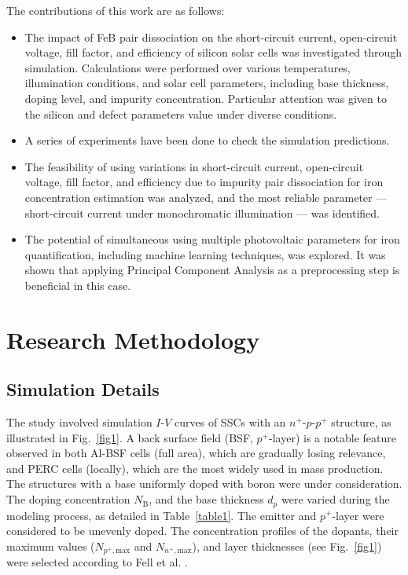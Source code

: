 \documentclass[a4paper,fleqn]{cas-sc}
\begin{document}
The contributions of this work are as follows:
\begin{itemize}[itemsep=2pt, parsep=0pt, topsep=0pt]
    \item The impact of FeB pair dissociation on the short-circuit current, open-circuit voltage, fill factor,
and efficiency of silicon solar cells was investigated through simulation.
Calculations were performed over various temperatures, illumination conditions, and solar cell parameters,
including base thickness, doping level, and impurity concentration.
Particular attention was given to the silicon and defect parameters value under diverse conditions.
    \item A series of experiments have been done to check the simulation predictions.
    \item The feasibility of using variations in short-circuit current, open-circuit voltage, fill factor,
and efficiency due to impurity pair dissociation for iron concentration estimation was analyzed,
and the most reliable parameter --- short-circuit current under monochromatic illumination --- was identified.
    \item The potential of simultaneous using multiple photovoltaic parameters for iron quantification, including machine learning techniques, was explored.
It was shown that applying Principal Component Analysis as a preprocessing step is beneficial in this case.
\end{itemize}


\section{Research Methodology}%

\subsection{Simulation Details}
The study involved simulation $I$-$V$ curves of SSCs with an $n^+$-$p$-$p^+$ structure,
as illustrated in Fig.~\ref{fig1}.
A back surface field (BSF, $p^+$-layer) is a notable feature observed in both Al-BSF cells (full area),
which are gradually losing relevance,
and PERC cells (locally), which are the most widely used in mass production.
The structures with a base uniformly doped with boron were under consideration.
The doping concentration $N_\mathrm{B}$, and the base thickness $d_p$ were varied during the modeling process, as detailed in Table~\ref{table1}.
The emitter and $p^+$-layer were considered to be unevenly doped.
The concentration profiles of the dopants, their maximum values ($N_{p^+,\mathrm{max}}$ and $N_{n^+,\mathrm{max}}$),
and layer thicknesses (see Fig.~\ref{fig1}) were selected according to Fell et al. \cite{Fell2015}.
\end{document}
